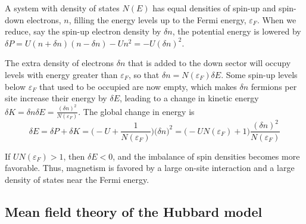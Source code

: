 A system with density of states $N(E)$ has equal densities of spin-up and spin-down electrons, $n$, filling the energy levels up to the Fermi energy, $\varepsilon_F$.
When we reduce, say the spin-up electron density by $\delta n$, the potential energy is lowered by $\delta P = U ( n + \delta n ) ( n - \delta n ) - U n^2 = - U (\delta n)^2$.

The extra density of electrons $\delta n$ that is added to the down sector will occupy levels with energy greater than $\varepsilon_F$, so that $\delta n = N ( \varepsilon_F ) \delta E$.
Some spin-up levels below $\varepsilon_F$ that used to be occupied are now empty, which makes $\delta n$ fermions per site increase their energy by $\delta E$, leading to a change in kinetic energy $\delta K = \delta n \delta E = \frac{(\delta n)^2}{N(\varepsilon_F)}$.
The global change in energy is
\begin{equation}
\delta E = \delta P + \delta K = \bigg( - U + \frac{1}{N(\varepsilon_F)} \bigg) \big( \delta n \big)^2 = \bigg( - U N ( \varepsilon_F ) + 1 \bigg) \frac{(\delta n)^2}{N(\varepsilon_F)}
\end{equation}

If $U N ( \varepsilon_F ) > 1$, then $\delta E < 0$, and the imbalance of spin densities becomes more favorable.
Thus, magnetism is favored by a large on-site interaction and a large density of states near the Fermi energy.

\subsection{Mean field theory of the Hubbard model}

